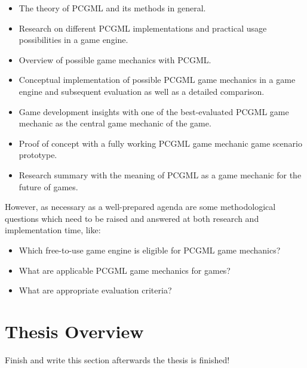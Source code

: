 \documentclass[MGS,Master,english]{twbook}%
\begin{document}
\begin{itemize}
	\item The theory of \ac{PCGML} and its methods in general.
	\item Research on different \ac{PCGML} implementations and practical usage possibilities in a game engine.
	\item Overview of possible game mechanics with \ac{PCGML}.
	\item Conceptual implementation of possible \ac{PCGML} game mechanics in a game engine and subsequent evaluation as well as a detailed comparison.
	\item Game development insights with one of the best-evaluated PCGML game mechanic as the central game mechanic of the game.
	\item Proof of concept with a fully working PCGML game mechanic game scenario prototype.
	\item Research summary with the meaning of \ac{PCGML} as a game mechanic for the future of games. 
\end{itemize}
However, as necessary as a well-prepared agenda are some methodological questions which need to be raised and answered at both research and implementation time, like:
\begin{itemize}
	\item Which free-to-use game engine is eligible for PCGML game mechanics?
	\item What are applicable PCGML game mechanics for games?
	\item What are appropriate evaluation criteria? 
\end{itemize} 


\section{Thesis Overview}
{\color{blue}Finish and write this section afterwards the thesis is finished!}
\end{document}
